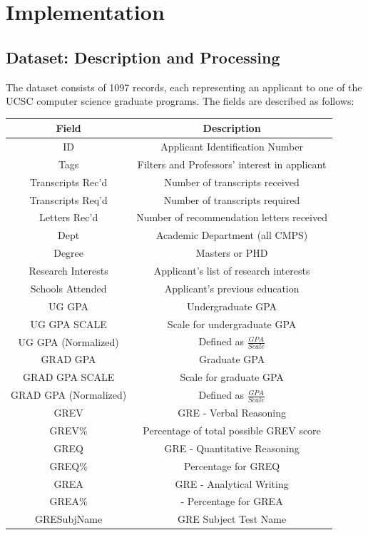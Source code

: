 \documentclass[]{article}
\begin{document}
\section{Implementation}
	\subsection{Dataset: Description and Processing}
		The dataset consists of 1097 records, each representing an applicant to one of the UCSC computer science graduate programs. The fields are described as follows:
		
		\begin{tabular}{c|c}
		 Field & Description \\ \hline
		 ID & Applicant Identification Number \\
		 Tags & Filters and Professors' interest in applicant\\
		 Transcripts Rec'd & Number of transcripts received \\ 
		 Transcripts Req'd & Number of transcripts required \\
		 Letters Rec'd & Number of recommendation letters received\\
		 Dept & Academic Department (all CMPS)\\
		 Degree & Masters or PHD\\
		 Research Interests & Applicant's list of research interests\\
		 Schools Attended & Applicant's previous education\\
		 UG GPA & Undergraduate GPA\\
		 UG GPA SCALE & Scale for undergraduate GPA\\ 
		 UG GPA (Normalized) & Defined as $\frac{GPA}{Scale}$\\ 
		 GRAD GPA & Graduate GPA\\
		 GRAD GPA SCALE & Scale for graduate GPA\\
		 GRAD GPA (Normalized) &  Defined as $\frac{GPA}{Scale}$\\
		 GREV & GRE - Verbal Reasoning\\
		 GREV\% & Percentage of total possible GREV score\\
		 GREQ & GRE - Quantitative Reasoning\\
		 GREQ\% & Percentage for GREQ\\
		 GREA & GRE - Analytical Writing\\
		 GREA\% & - Percentage for GREA\\
		 GRESubjName & GRE Subject Test Name \\ 

\end{tabular}
\end{document}
